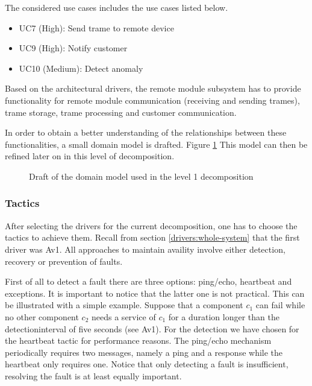 \npar The considered use cases includes the use cases listed below. 

\begin{itemize}
	\item UC7 (High): Send trame to remote device
	\item UC9 (High): Notify customer
	\item UC10 (Medium): Detect anomaly
\end{itemize}

\npar Based on the architectural drivers, the remote module subsystem has to
provide functionality for remote module communication (receiving and sending
trames), trame storage, trame processing and customer communication. 

\npar In order to obtain a better understanding of the relationships between
these functionalities, a small domain model is drafted. Figure
\ref{fig:dec/whole-system/draft} This model can then be refined later on
in this level of decomposition.

\begin{figure}[H]
	\begin{centering}
		\caption{Draft of the domain model used in the level 1 decomposition}
		\label{fig:dec/whole-system/draft}
	\end{centering}
\end{figure}

\subsubsection{Tactics}
\label{tactics:whole-system}

\npar After selecting the drivers for the current decomposition, one has to
choose the tactics to achieve them. Recall from section
\ref{drivers:whole-system} that the first driver was Av1. All approaches to
maintain availity involve either detection, recovery or prevention of faults.

\npar First of all to detect a fault there are three options: ping/echo,
heartbeat and exceptions. It is important to notice that the latter one is not
practical. This can be illustrated with a simple example. Suppose that a
component $c_1$ can fail while no other component $c_2$ needs a service of
$c_1$ for a duration longer than the detectioninterval of five seconds (see
Av1). For the detection we have chosen for the heartbeat tactic for
performance reasons. The ping/echo mechanism periodically requires two
messages, namely a ping and a response while the heartbeat only requires
one. Notice that only detecting a fault is insufficient, resolving the fault is
at least equally important.

